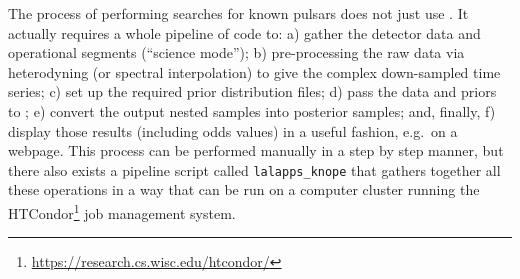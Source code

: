 The process of performing searches for known pulsars does not just use \lppen. It actually requires a whole pipeline of code to: a) gather the \gw detector
data and operational segments (``science mode''); b) pre-processing the raw data via heterodyning (or spectral interpolation) to give the complex down-sampled
time series; c) set up the required prior distribution files; d) pass the data and priors to \lppen; e) convert the output nested samples into posterior samples;
and, finally, f) display those results (including odds values) in a useful fashion, e.g.\ on a webpage. This process can be performed manually in a step by step
manner, but there also exists a pipeline script called {\tt lalapps\_knope} that gathers together all these operations in a way that can be run on a computer
cluster running the HTCondor\footnote{\url{https://research.cs.wisc.edu/htcondor/}} job management system.


